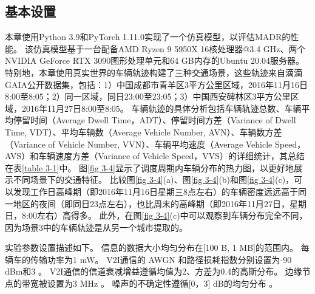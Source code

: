 \subsection{基本设置}
本章使用Python 3.9和PyTorch 1.11.0实现了一个仿真模型，以评估MADR的性能。
该仿真模型基于一台配备AMD Ryzen 9 5950X 16核处理器@3.4 GHz、两个NVIDIA GeForce RTX 3090图形处理单元和64 GB内存的Ubuntu 20.04服务器。
特别地，本章使用真实世界的车辆轨迹构建了三种交通场景，这些轨迹来自滴滴GAIA公开数据集，包括：1）中国成都市青羊区3平方公里区域，2016年11月16日8:00至8:05；2）同一区域，同日23:00至23:05；3）中国西安碑林区3平方公里区域，2016年11月27日8:00至8:05。
车辆轨迹的具体分析包括车辆轨迹总数、车辆平均停留时间（Average Dwell Time，ADT）、停留时间方差（Variance of Dwell Time, VDT）、平均车辆数（Average Vehicle Number, AVN）、车辆数方差（Variance of Vehicle Number, VVN）、车辆平均速度（Average Vehicle Speed，AVS）和车辆速度方差（Variance of Vehicle Speed，VVS）的详细统计，其总结在表\ref{table 3-1}中。
图\ref{fig 3-4}显示了调度周期内车辆分布的热力图，以更好地展示不同场景下的交通特征。
比较图\ref{fig 3-4}(a)、图\ref{fig 3-4}(b)和图\ref{fig 3-4}(c)，可以发现工作日高峰期（即2016年11月16日星期三8点左右）的车辆密度远远高于同一地区的夜间（即同日23点左右），也比周末的高峰期（即2016年11月27日，星期日，8:00左右）高得多。
此外，在图\ref{fig 3-4}(c)中可以观察到车辆分布完全不同，因为场景3中的车辆轨迹是从另一个城市提取的。

实验参数设置描述如下。
信息的数据大小均匀分布在[100 B, 1 MB]的范围内。
每辆车的传输功率为1 mW。
V2I通信的 AWGN 和路径损耗指数分别设置为-90 dBm和3 \cite{sadek2009distributed}。
V2I通信的信道衰减增益遵循均值为2、方差为0.4的高斯分布。
边缘节点的带宽被设置为3 MHz \cite{wang2019delay}。
噪声的不确定性遵循[0，3] dB的均匀分布 \cite{tandra2008snr}。

\begin{table}[h]\small
\centering
{}
\label{table 3-1}
\end{table}

